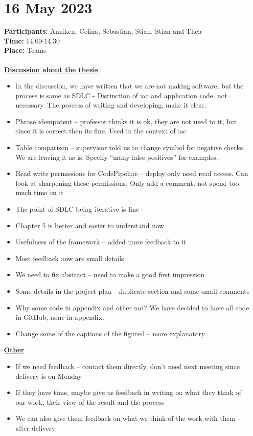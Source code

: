 \section{16 May 2023}
\textbf{Participants:} Anniken, Celina, Sebastian, Stian, Stian and Thea\\
\textbf{Time:} 14.00-14.30 \\
\textbf{Place:} Teams
\\~\\
\textbf{\underline{Discussion about the thesis}}
\begin{itemize}
    \item In the discussion, we have written that we are not making software, but the process is same as SDLC - Distinction of iac and application code, not necessary. The process of writing and developing, make it clear. 
    \item Phrase idempotent – professor thinks it is ok, they are not used to it, but since it is correct then its fine. Used in the context of iac 
    \item Table comparison – supervisor told us to change symbol for negative checks. We are leaving it as is. Specify “many false positives” for examples. 
    \item Read write permissions for CodePipeline – deploy only need read access. Can look at sharpening these permissions. Only add a comment, not spend too much time on it 
    \item The point of SDLC being iterative is fine 
    \item Chapter 5 is better and easier to understand now 
    \item Usefulness of the framework – added more feedback to it
    \item Most feedback now are small details 
    \item We need to fix abstract – need to make a good first impression
    \item Some details in the project plan - duplicate section and some small comments
    \item Why some code in appendix and other not? We have decided to have all code in GitHub, none in appendix. 
    \item Change some of the captions of the figured – more explanatory
\end{itemize}

\textbf{\underline{Other}}
\begin{itemize}
    \item If we need feedback – contact them directly, don’t need next meeting since delivery is on Monday 
    \item If they have time, maybe give us feedback in writing on what they think of our work, their view of the result and the process
    \item We can also give them feedback on what we think of the work with them - after delivery
\end{itemize}
